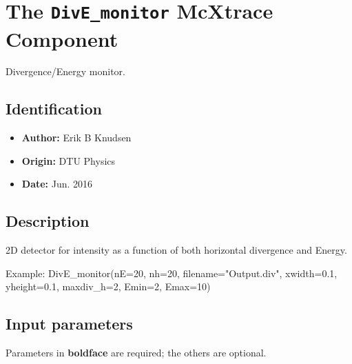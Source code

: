 \section{The \texttt{DivE\_monitor} McXtrace Component}
Divergence/Energy monitor.

\subsection*{Identification}
\begin{itemize}
  \item \textbf{Author:} Erik B Knudsen
  \item \textbf{Origin:} DTU Physics
  \item \textbf{Date:} Jun. 2016
\end{itemize}

\subsection*{Description}
2D detector for intensity as a function of both horizontal divergence and Energy.

Example: DivE\_monitor(nE=20, nh=20, filename="Output.div", xwidth=0.1, yheight=0.1, maxdiv\_h=2, Emin=2, Emax=10)

\subsection*{Input parameters}
Parameters in \textbf{boldface} are required; the others are optional.

